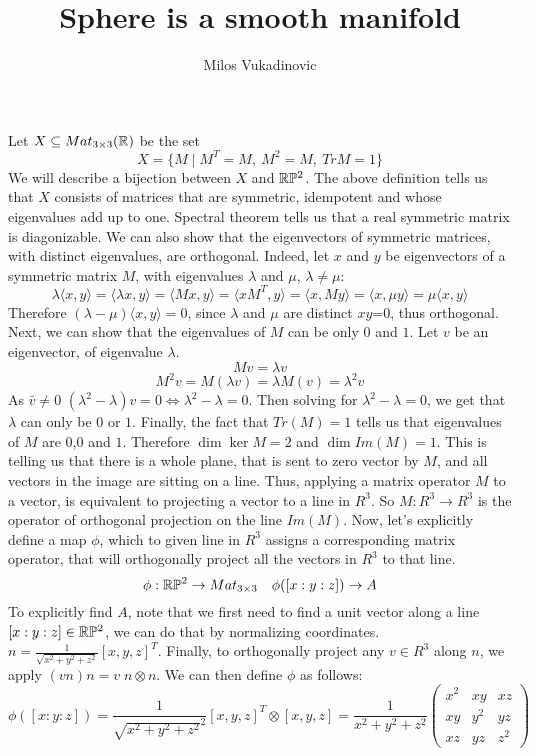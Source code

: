 \documentclass[11pt,a4paper]{report}
\author{Milos Vukadinovic}
\title{Sphere is a smooth manifold}
\begin{document}
Let $X \subseteq Mat_{3 \times 3}(\mathbb{R})$ be the set
$$ X = \{ M \mid M^T = M, \: M^2 = M,\: Tr M = 1 \}$$
We will describe a bijection between $X$ and $\mathbb{R} \mathbb{P}^2$.
The above definition tells us that $X$ consists of matrices that are symmetric, idempotent and whose eigenvalues add up to one.
Spectral theorem tells us that a real symmetric matrix is diagonizable.
We can also show that the eigenvectors of symmetric matrices, with distinct eigenvalues, are orthogonal.
Indeed, let $x$ and $y$ be eigenvectors of a symmetric matrix $M$, with eigenvalues $\lambda$ and $\mu$, $\lambda \neq \mu$:
$$ \lambda \langle x,y \rangle = \langle \lambda x,  y \rangle = \langle M x, y \rangle = \langle x M^T, y \rangle = \langle x, M y \rangle = \langle x, \mu y \rangle = \mu \langle x, y \rangle  $$
Therefore $(\lambda - \mu) \langle x , y \rangle = 0$, since $\lambda$ and $\mu$ are distinct $xy$=0, thus orthogonal.
Next, we can show that the eigenvalues of $M$ can be only $0$ and $1$.
Let $v$ be an eigenvector, of eigenvalue $\lambda$.
$$ M v = \lambda v $$
$$ M^2 v = M (\lambda v) = \lambda M (v) = \lambda^2 v $$
As $\bar{v} \neq 0$ $(\lambda^2 - \lambda) v = 0 \iff \lambda^2 - \lambda = 0$.
Then solving for $\lambda^2-\lambda = 0$, we get that $\lambda$ can only be $0$ or $1$.
Finally, the fact that $Tr(M)=1$ tells us that eigenvalues of $M$ are $0$,$0$ and $1$.
Therefore $\dim \ker M = 2$ and $ \dim Im(M) = 1 $. This is telling us that there is a whole plane,
that is sent to zero vector by $M$, and all vectors in the image are sitting on a line.
\newline
Thus, applying a matrix operator $M$ to a vector,
is equivalent to projecting a vector to a line in $R^3$.
So $M :R^3 \to R^3$ is the operator of orthogonal projection on the line $Im(M)$.
\newline
Now, let's explicitly define a map $\phi$, which to given line in $R^3$ assigns a corresponding matrix operator,
that will orthogonally project all the vectors in $R^3$ to that line.
$$ \phi: \mathbb{R} \mathbb{P} ^2 \to Mat_{3 \times 3}  \quad \phi([x:y:z]) \to A $$
To explicitly find $A$, note that we first need to find a unit vector along a line $[x:y:z] \in \mathbb{R} \mathbb{P} ^2$,
we can do that by normalizing coordinates. $n = \frac{1}{\sqrt{x^2 + y^2 + z^2}} [x,y,z]^T $.
Finally, to orthogonally project any $v \in R^3$ along $n$, we apply $(v n) n = v \; n \otimes n$. We can then define $\phi$ as follows:
$$ \phi([x:y:z])  = \frac{1}{\sqrt{x^2+y^2+z^2}^2} [x,y,z]^T \otimes [x,y,z] = \frac{1}{x^2 + y^2 + z^2} 
\begin{pmatrix}
x^2 & xy & xz \\
xy & y^2 & yz  \\
xz & yz & z^2
\end{pmatrix} $$
\end{document}
